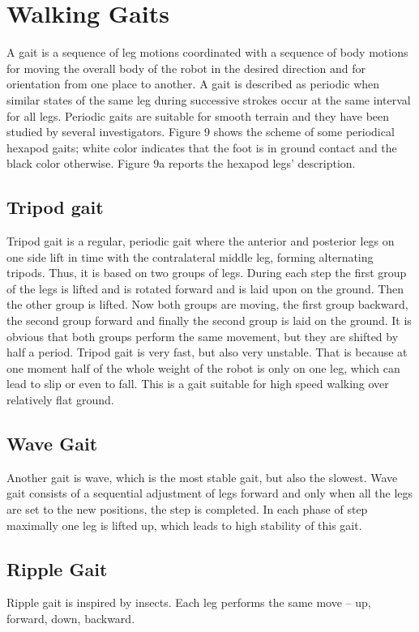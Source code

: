 \section{Walking Gaits}
A gait is a sequence of leg motions coordinated with a sequence of body motions for moving the overall body of the robot in the desired direction and for orientation from one place to another. A gait is described as periodic when similar states of the same leg during successive strokes occur at the same interval for all legs. Periodic gaits are suitable for smooth terrain and they have been studied by several investigators. Figure 9 shows the scheme of some periodical hexapod gaits; white color indicates that the foot is in ground contact and the black color otherwise. Figure 9a reports the hexapod legs’ description.

\subsection{Tripod gait}
Tripod gait is a regular, periodic gait where the anterior and posterior legs on one side lift in time with the contralateral middle leg, forming alternating tripods. Thus, it is based on two groups of legs. During each step the first group of the legs is lifted and is rotated forward and is laid upon on the ground. Then the other group is lifted. Now both groups are moving, the first group backward, the second group forward and finally the second group is laid on the ground. It is obvious that both groups perform the same movement, but they are shifted by half a period. Tripod gait is very fast, but also very unstable. That is because at one moment half of the whole weight of the robot is only on one leg, which can lead to slip or even to fall. This is a gait suitable for high speed walking over relatively flat ground.

\subsection{Wave Gait}
Another gait is wave, which is the most stable gait, but also the slowest. Wave gait consists of a sequential adjustment of legs forward and only when all the legs are set to the new positions, the step is completed. In each phase of step maximally one leg is lifted up, which leads to high stability of this gait.

\subsection{Ripple Gait}
Ripple gait is inspired by insects. Each leg performs the same move – up, forward, down, backward.

